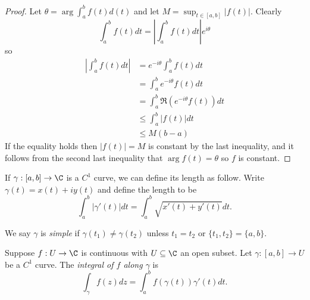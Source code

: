 \documentclass[a4paper]{article}
\begin{document}
\begin{proof}
  Let \(\theta = \arg \int_a^b f(t)d(t)\) and let \(M = \sup_{t \in [a, b]} |f(t)|\). Clearly
  \[
    \int_a^b f(t) dt = \left| \int_a^b f(t) dt\right| e^{i\theta}
  \]
  so
  \begin{align*}
    \left|\int_a^b f(t)dt\right| &= e^{-i\theta} \int_a^b f(t) dt \\
                                 &= \int_a^b e^{-i\theta}f(t)dt \\
                                 &= \int_a^b \Re(e^{-i\theta}f(t)) dt \\
                                 &\leq \int_a^b|f(t)|dt \\
                                 &\leq M(b - a)
  \end{align*}
  If the equality holds then \(|f(t)| = M\) is constant by the last inequality, and it follows from the second last inequality that \(\arg f(t) = \theta\) so \(f\) is constant.
\end{proof}

If \(\gamma: [a, b] \to \C\) is a \(C^1\) curve, we can define its length as follow. Write \(\gamma(t) = x(t) + iy(t)\) and define the length to be
\[
  \int_a^b |\gamma'(t)|dt = \int_a^b \sqrt{x'(t) + y'(t)} dt.
\]

\begin{definition}
  We say \(\gamma\) is \emph{simple} if \(\gamma(t_1) \neq \gamma(t_2)\) unless \(t_1 = t_2\) or \(\{t_1, t_2\} = \{a, b\}\).
\end{definition}

\begin{definition}
  Suppose \(f: U \to \C\) is continuous with \(U \subseteq \C\) an open subset. Let \(\gamma: [a, b] \to U\) be a \(C^1\) curve. The \emph{integral of \(f\) along \(\gamma\)} is
  \[
    \int_\gamma f(z)dz = \int_a^b f(\gamma(t))\gamma'(t) dt.
  \]
\end{definition}
\end{document}

